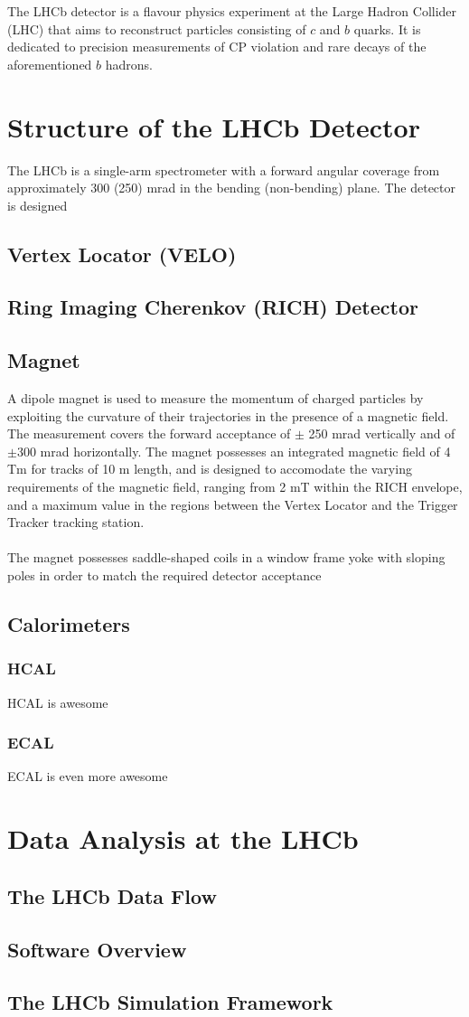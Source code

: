 The LHCb detector is a flavour physics experiment at the Large Hadron Collider (LHC) that aims to reconstruct particles 
consisting of $c$ and $b$ quarks. It is dedicated to precision measurements of CP violation and rare decays of the aforementioned $b$ 
hadrons.  
\section{Structure of the LHCb Detector}
The LHCb is a single-arm spectrometer with a forward angular coverage from approximately 300 (250) mrad in the bending (non-bending) plane. The detector is designed 
\subsection{Vertex Locator (VELO)}
\subsection{Ring Imaging Cherenkov (RICH) Detector}
\subsection{Magnet}
A dipole magnet is used to measure the momentum of charged particles by exploiting the curvature of their trajectories in the presence of a magnetic field. The measurement covers the forward acceptance of $\pm$ 250 mrad vertically and of $\pm$300 mrad horizontally. The magnet possesses an integrated magnetic field of 4 Tm for tracks of 10 m length, and is designed to accomodate the varying requirements of the magnetic field, ranging from 2 mT within the RICH envelope, and a maximum value in the regions between the Vertex Locator and the Trigger Tracker tracking station.\\
\\
The magnet possesses saddle-shaped coils in a window frame yoke with sloping poles in order to match the required detector acceptance
\subsection{Calorimeters}
\subsubsection{HCAL}
HCAL is awesome 
\subsubsection{ECAL}
ECAL is even more awesome
\section{Data Analysis at the LHCb}
\subsection{The LHCb Data Flow}
\subsection{Software Overview}
\subsection{The LHCb Simulation Framework}



